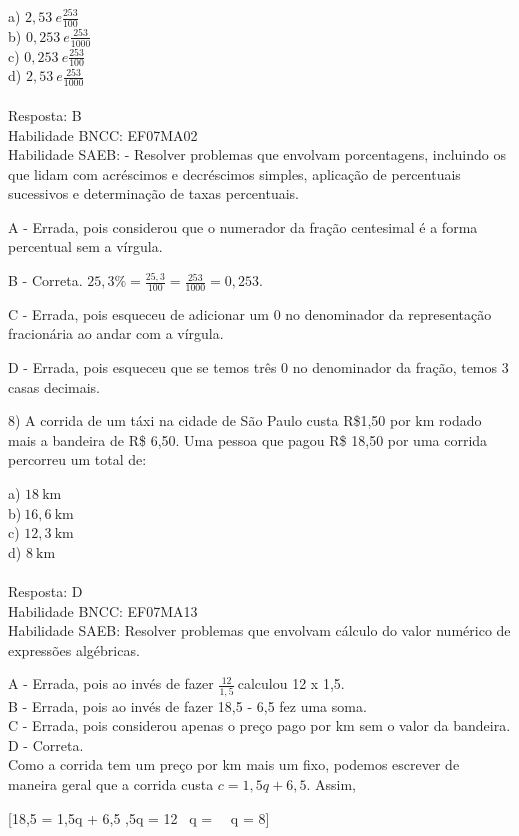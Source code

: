 a) \(2,53\ e\frac{253}{100}\)\\
b) \(0,253\ e\frac{253}{1000}\)\\
c) \(0,253\ e\frac{253}{100}\)\\
d) \(2,53\ e\frac{253}{1000}\)\\
~\\
Resposta: B\\
Habilidade BNCC: EF07MA02\\
Habilidade SAEB: - Resolver problemas que envolvam porcentagens,
incluindo os que lidam com acréscimos e decréscimos simples, aplicação
de percentuais sucessivos e determinação de taxas percentuais.

A - Errada, pois considerou que o numerador da fração centesimal é a
forma percentual sem a vírgula.

B - Correta. \(25,3\% = \frac{25,3}{100} = \frac{253}{1000} = 0,253\).

C - Errada, pois esqueceu de adicionar um 0 no denominador da
representação fracionária ao andar com a vírgula.

D - Errada, pois esqueceu que se temos três 0 no denominador da fração,
temos 3 casas decimais.

8) A corrida de um táxi na cidade de São Paulo custa R\$1,50 por km
rodado mais a bandeira de R\$ 6,50. Uma pessoa que pagou R\$ 18,50 por
uma corrida percorreu um total de:

a) \(18\ \text{km}\)\\
b)\(\ 16,6\ \text{km}\)\\
c) \(12,3\ \text{km}\)\\
d) \(8\ \text{km}\)\\
~\\
Resposta: D\\
Habilidade BNCC: EF07MA13\\
Habilidade SAEB: Resolver problemas que envolvam cálculo do valor
numérico de expressões algébricas.

A - Errada, pois ao invés de fazer \(\frac{12}{1,5}\ \)calculou 12 x
1,5.\\
B - Errada, pois ao invés de fazer 18,5 - 6,5 fez uma soma.\\
C - Errada, pois considerou apenas o preço pago por km sem o valor da
bandeira.\\
D - Correta.\\
Como a corrida tem um preço por km mais um fixo, podemos escrever de
maneira geral que a corrida custa \(c = 1,5q + 6,5\). Assim,

[18,5 = 1,5q + 6,5 ,5q = 12 \rightarrow \ q =  \rightarrow \ \ q = 8]

